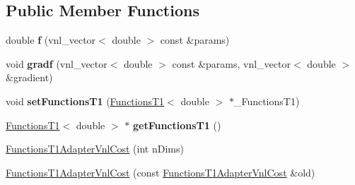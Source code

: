 \subsection*{Public Member Functions}
\begin{DoxyCompactItemize}
\item 
\hypertarget{class_ox_1_1_functions_t1_adapter_vnl_cost_ae74d956d16b010a32cfabda090674d4b}{double {\bfseries f} (vnl\-\_\-vector$<$ double $>$ const \&params)}\label{class_ox_1_1_functions_t1_adapter_vnl_cost_ae74d956d16b010a32cfabda090674d4b}

\item 
\hypertarget{class_ox_1_1_functions_t1_adapter_vnl_cost_a6a147aabdfb2c40916fe353044739484}{void {\bfseries gradf} (vnl\-\_\-vector$<$ double $>$ const \&params, vnl\-\_\-vector$<$ double $>$ \&gradient)}\label{class_ox_1_1_functions_t1_adapter_vnl_cost_a6a147aabdfb2c40916fe353044739484}

\item 
\hypertarget{class_ox_1_1_functions_t1_adapter_vnl_cost_a42a684f88c04d8b1bfafeb010a27a6fd}{void {\bfseries set\-Functions\-T1} (\hyperlink{class_ox_1_1_functions_t1}{Functions\-T1}$<$ double $>$ $\ast$\-\_\-\-Functions\-T1)}\label{class_ox_1_1_functions_t1_adapter_vnl_cost_a42a684f88c04d8b1bfafeb010a27a6fd}

\item 
\hypertarget{class_ox_1_1_functions_t1_adapter_vnl_cost_a8550e4df6a10d70787dbbdd92b319d97}{\hyperlink{class_ox_1_1_functions_t1}{Functions\-T1}$<$ double $>$ $\ast$ {\bfseries get\-Functions\-T1} ()}\label{class_ox_1_1_functions_t1_adapter_vnl_cost_a8550e4df6a10d70787dbbdd92b319d97}

\item 
\hyperlink{class_ox_1_1_functions_t1_adapter_vnl_cost_a50534fc003f255547fd9a990a6fad038}{Functions\-T1\-Adapter\-Vnl\-Cost} (int n\-Dims)
\item 
\hyperlink{class_ox_1_1_functions_t1_adapter_vnl_cost_a6fe96f7359794ef4d1dc00cd6defa498}{Functions\-T1\-Adapter\-Vnl\-Cost} (const \hyperlink{class_ox_1_1_functions_t1_adapter_vnl_cost}{Functions\-T1\-Adapter\-Vnl\-Cost} \&old)
\end{DoxyCompactItemize}


